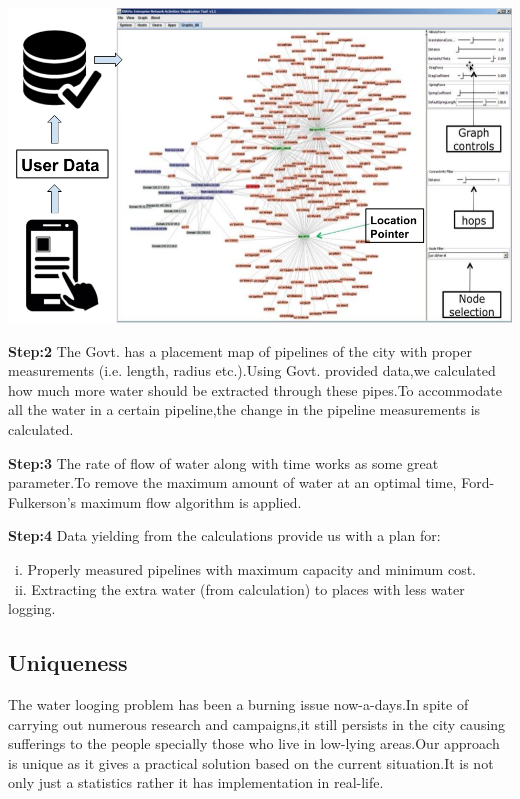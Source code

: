 \documentclass{acm_proc_article-sp}
\begin{document}
\begin{center}\vspace{0.2cm}
\includegraphics[width=1.0\linewidth]{flow.png}
\end{center}\vspace{0.5cm}

\textbf{Step:2} The Govt. has a placement map of pipelines of the city with proper measurements (i.e. length, radius etc.).Using Govt. provided data,we calculated how much more water should be extracted through these pipes.To accommodate all the water in a certain pipeline,the change in the pipeline measurements is calculated. 

\textbf{Step:3} The rate of flow of water along with time works as some great parameter.To remove the maximum amount of water at an optimal time, Ford-Fulkerson's maximum flow algorithm is applied. 

\textbf{Step:4} Data yielding from the calculations provide us with a plan for:

\ i. Properly measured pipelines with maximum capacity and minimum cost.\\
\ ii. Extracting the extra water (from calculation) to places with less water logging.


\subsection{Uniqueness}

The water looging problem has been a burning issue now-a-days.In spite of carrying out numerous research and campaigns,it still persists in the city causing sufferings to the people specially those who live in low-lying areas.Our approach is unique as it gives a practical solution based on the current situation.It is not only just a statistics rather it has implementation in real-life.
\end{document}
